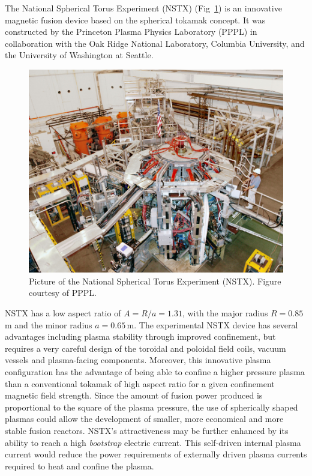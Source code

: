 \documentclass[12pt,lot, lof]{puthesis}
\begin{document}
The National Spherical Torus Experiment (NSTX)  (Fig~\ref{nstx2}) is an innovative magnetic fusion device based on the spherical tokamak concept. It was constructed by the Princeton Plasma Physics Laboratory (PPPL) in collaboration with the Oak Ridge National Laboratory, Columbia University, and the University of Washington at Seattle.
\begin{figure}
\centering
\includegraphics[width= 0.9\linewidth]{nstx2}
\caption{Picture of the National Spherical Torus Experiment (NSTX). Figure courtesy of PPPL.}
\label{nstx2}
\end{figure}

NSTX has a low aspect ratio of $A= R/a =1.31$, with the major radius $R =0.85$\,m and the minor radius $a =0.65$\,m.
The experimental NSTX device has several advantages including plasma stability through improved confinement, but requires a very careful design of the toroidal and poloidal field coils, vacuum vessels and plasma-facing components. Moreover, this innovative plasma configuration has the advantage of being able to confine a higher pressure plasma than a conventional tokamak of high aspect ratio for a given confinement magnetic field strength. Since the amount of fusion power produced is proportional to the square of the plasma pressure, the use of spherically shaped plasmas could allow the development of smaller, more economical and more stable fusion reactors. NSTX's attractiveness may be further enhanced by its ability to reach a high \emph{bootstrap} electric current. This self-driven internal plasma current would reduce the power requirements of externally driven plasma currents required to heat and confine the plasma.
\end{document}
